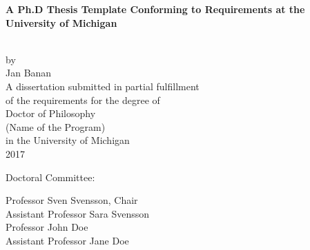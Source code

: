 \begin{titlepage}
 \begin{singlespace} %
  \hbox{\vspace{1.2in}} %
  \begin{center} %
   \begin{onehalfspacing}
    {\Large\bfseries A Ph.D Thesis Template Conforming to Requirements at the University of Michigan} %
   \end{onehalfspacing} \\[4ex] %
   by \\[2ex] %
   Jan Banan \\ %
   \vfill %
   A dissertation submitted in partial fulfillment \\ %
   of the requirements for the degree of \\ %
   Doctor of Philosophy \\ %
   (Name of the Program) \\ %
   in the University of Michigan \\ %
   2017 %
  \end{center} %
  \vfill %
  \begin{flushleft}
   \hspace{0.7in}Doctoral Committee: \\[2ex] %
   \hspace{1in} %
   \parbox{4.2in}{Professor Sven Svensson, Chair\\
   				  Assistant Professor Sara Svensson\\
   				  Professor John Doe\\
   				  Assistant Professor Jane Doe}
  \end{flushleft} %
 \end{singlespace} %
\end{titlepage}

\clearpage
\thispagestyle{empty}

\hspace{0pt}

\vfill

